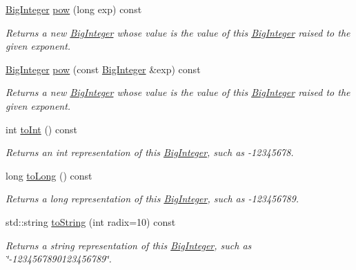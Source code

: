 \begin{DoxyCompactItemize}
\mbox{\hyperlink{classBigInteger}{Big\+Integer}} \mbox{\hyperlink{classBigInteger_a2679d1fe9cb5daed464a9ab0783e2825}{pow}} (long exp) const
\begin{DoxyCompactList}\small\item\em Returns a new \mbox{\hyperlink{classBigInteger}{Big\+Integer}} whose value is the value of this \mbox{\hyperlink{classBigInteger}{Big\+Integer}} raised to the given exponent. \end{DoxyCompactList}\item 
\mbox{\hyperlink{classBigInteger}{Big\+Integer}} \mbox{\hyperlink{classBigInteger_af004e9189931255ce5d71f55d4ab4976}{pow}} (const \mbox{\hyperlink{classBigInteger}{Big\+Integer}} \&exp) const
\begin{DoxyCompactList}\small\item\em Returns a new \mbox{\hyperlink{classBigInteger}{Big\+Integer}} whose value is the value of this \mbox{\hyperlink{classBigInteger}{Big\+Integer}} raised to the given exponent. \end{DoxyCompactList}\item 
int \mbox{\hyperlink{classBigInteger_a8cc7782de081ce702a9be163b4cb8f84}{to\+Int}} () const
\begin{DoxyCompactList}\small\item\em Returns an int representation of this \mbox{\hyperlink{classBigInteger}{Big\+Integer}}, such as -\/12345678. \end{DoxyCompactList}\item 
long \mbox{\hyperlink{classBigInteger_aa762dbabd60643be2be9aa9eb14deddb}{to\+Long}} () const
\begin{DoxyCompactList}\small\item\em Returns a long representation of this \mbox{\hyperlink{classBigInteger}{Big\+Integer}}, such as -\/123456789. \end{DoxyCompactList}\item 
std\+::string \mbox{\hyperlink{classBigInteger_a23af335cf9a414459a10205e2031c182}{to\+String}} (int radix=10) const
\begin{DoxyCompactList}\small\item\em Returns a string representation of this \mbox{\hyperlink{classBigInteger}{Big\+Integer}}, such as \char`\"{}-\/1234567890123456789\char`\"{}. \end{DoxyCompactList}\end{DoxyCompactItemize}
